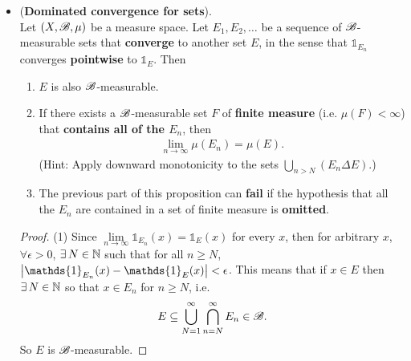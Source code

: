 \documentclass[11pt]{article}
\begin{document}
\begin{itemize}
\item \begin{proposition} (\textbf{Dominated convergence for sets}). \citep{tao2011introduction} \\
Let $(X, {\mathscr B}, \mu)$ be a measure space. Let $E_1, E_2, \ldots $ be a sequence of ${\mathscr B}$-measurable sets that \textbf{converge} to another set $E$, in the sense that $\mathds{1}_{E_n}$ converges \textbf{pointwise} to $\mathds{1}_{E}$. Then 
\begin{enumerate}
\item $E$ is also ${\mathscr B}$-measurable.
\item If there exists a ${\mathscr B}$-measurable set $F$ of \textbf{finite measure} (i.e. $\mu(F) < \infty$) that \textbf{contains all of the $E_n$}, then
\begin{align*}
\lim\limits_{n \rightarrow \infty} \mu(E_n) = \mu(E). 
\end{align*}
(Hint: Apply downward monotonicity to the sets $\bigcup_{n>N}(E_n \Delta E)$.)
\item The previous part of this proposition can \textbf{fail} if the hypothesis that all the $E_n$ are contained in a set of finite measure is \textbf{omitted}.
\end{enumerate}
\end{proposition}
\begin{proof} 
(1) Since $\lim\limits_{n \rightarrow \infty}\mathds{1}_{E_n}(x) = \mathds{1}_{E}(x)$ for every $x$, then for arbitrary $x$, $\forall \epsilon >0$, $\exists\, N \in {\mathbb N}$ such that for all $ n \ge N$, $\abs{\mathds{1}_{E_n}(x)  - \mathds{1}_{E}(x) } < \epsilon$.   This means that  if $x \in E$ then $\exists\, N \in {\mathbb N}$ so that $x \in E_n$ for $n \ge N$, i.e.
\begin{align*}
E \subseteq \bigcup_{N =1}^{\infty}\bigcap_{n = N}^{\infty}E_n \in {\mathscr B}.
\end{align*} So $E$ is  ${\mathscr B}$-measurable.


\end{proof}
\end{itemize}
\end{document}

